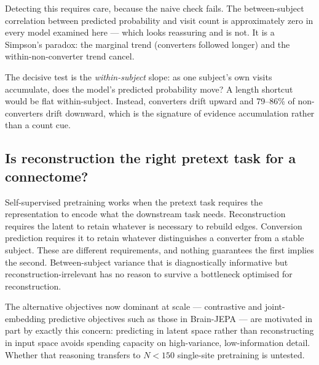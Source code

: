 Detecting this requires care, because the naive check fails. The between-subject
correlation between predicted probability and visit count is approximately zero in every
model examined here --- which looks reassuring and is not. It is a Simpson's paradox: the
marginal trend (converters followed longer) and the within-non-converter trend cancel.

The decisive test is the \emph{within-subject} slope: as one subject's own visits
accumulate, does the model's predicted probability move? A length shortcut would be flat
within-subject. Instead, converters drift upward and 79--86\% of non-converters drift
downward, which is the signature of evidence accumulation rather than a count cue.


\subsection{Is reconstruction the right pretext task for a connectome?}
\label{sec:gap-pretext}

Self-supervised pretraining works when the pretext task requires the representation to
encode what the downstream task needs. Reconstruction requires the latent to retain
whatever is necessary to rebuild edges. Conversion prediction requires it to retain
whatever distinguishes a converter from a stable subject. These are different
requirements, and nothing guarantees the first implies the second. Between-subject
variance that is diagnostically informative but reconstruction-irrelevant has no reason to
survive a bottleneck optimised for reconstruction.

The alternative objectives now dominant at scale --- contrastive and joint-embedding
predictive objectives such as those in Brain-JEPA --- are motivated in part by exactly
this concern: predicting in latent space rather than reconstructing in input space avoids
spending capacity on high-variance, low-information detail. Whether that reasoning
transfers to $N < 150$ single-site pretraining is untested.


